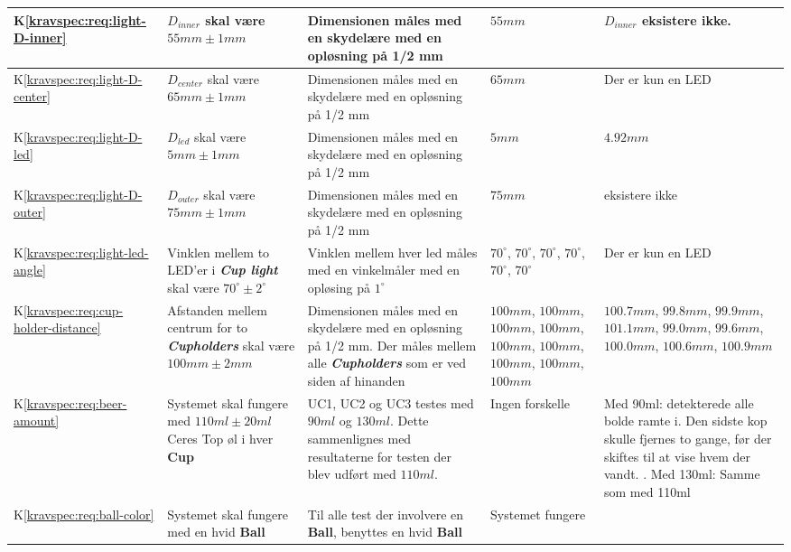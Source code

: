 \documentclass[Accepttestspecifikation/Accepttest_Main.tex]{subfiles}
\begin{document}
\begin{longtable}{|L{0.08\textwidth}|L{0.3\textwidth}|L{0.3\textwidth}|L{0.2\textwidth}|L{0.2\textwidth}|}
K\ref{kravspec:req:light-D-inner}& $D_{inner}$ skal være $55\si{mm} \pm 1\si{mm}$ & Dimensionen måles med en skydelære med en opløsning på 1/2 mm & $55\si{mm}$ & $D_{inner}$ eksistere ikke. \\ \hline
K\ref{kravspec:req:light-D-center}& $D_{center}$ skal være $65\si{mm} \pm 1\si{mm}$  & Dimensionen måles med en skydelære med en opløsning på 1/2 mm & $65\si{mm}$ & Der er kun en LED\\ \hline
K\ref{kravspec:req:light-D-led} & $D_{led}$ skal være $5\si{mm} \pm 1\si{mm}$ & Dimensionen måles med en skydelære med en opløsning på 1/2 mm & $5\si{mm}$ & $4.92mm$ \\ \hline
K\ref{kravspec:req:light-D-outer}& $D_{outer}$ skal være $75\si{mm} \pm 1\si{mm}$ & Dimensionen måles med en skydelære med en opløsning på 1/2 mm & $75\si{mm}$ & eksistere ikke \\ \hline
K\ref{kravspec:req:light-led-angle}& Vinklen mellem to LED'er i \textit{\textbf{Cup light}} skal være $70^{\circ} \pm 2^{\circ}$ & Vinklen mellem hver led måles med en vinkelmåler med en opløsing på $1^{\circ}$ & $70^{\circ}$, $70^{\circ}$, $70^{\circ}$, $70^{\circ}$, $70^{\circ}$, $70^{\circ}$ &  Der er kun en LED \\ \hline
K\ref{kravspec:req:cup-holder-distance} & Afstanden mellem centrum for to \textit{\textbf{Cupholders}} skal være $100\si{mm} \pm 2\si{mm}$ & Dimensionen måles med en skydelære med en opløsning på 1/2 mm. Der måles mellem alle \textit{\textbf{Cupholders}} som er ved siden af hinanden & $100\si{mm}$, $100\si{mm}$, $100\si{mm}$, $100\si{mm}$, $100\si{mm}$, $100\si{mm}$, $100\si{mm}$, $100\si{mm}$, $100\si{mm}$ & $100.7\si{mm}$, $99.8\si{mm}$, $99.9\si{mm}$, $101.1\si{mm}$, $99.0\si{mm}$, $99.6\si{mm}$, $100.0\si{mm}$, $100.6\si{mm}$, $100.9\si{mm}$\\ \hline
K\ref{kravspec:req:beer-amount}& Systemet skal fungere med $110\si{ml} \pm 20\si{ml}$ Ceres Top øl i hver \textbf{Cup} & UC1, UC2 og UC3 testes med $90\si{ml}$ og $130\si{ml}$. Dette sammenlignes med resultaterne for testen der blev udført med $110\si{ml}$. & Ingen forskelle & Med 90ml: detekterede alle bolde ramte i. Den sidste kop skulle fjernes to gange, før der skiftes til at vise hvem der vandt. . 
Med 130ml: Samme som med 110ml\\ \hline
K\ref{kravspec:req:ball-color} & Systemet skal fungere med en hvid \textbf{Ball} & Til alle test der involvere en \textbf{Ball}, benyttes en hvid \textbf{Ball}& Systemet fungere & \\ \hline

\end{longtable}
\end{document}
